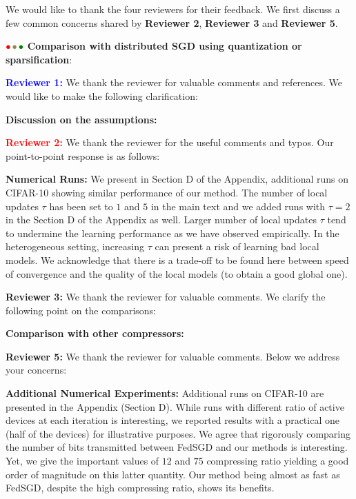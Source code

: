 \documentclass{article}
\begin{document}
We would like to thank the four reviewers for their feedback. 
We first discuss a few common concerns shared by \textbf{\color{red} Reviewer 2}, \textbf{\color{yellow!50!black}Reviewer 3} and \textbf{\color{green!50!black}Reviewer 5}.

${\color{red}\bullet}\!~{\color{yellow!50!black}\bullet}\!~{\color{green!50!black}\bullet}$ \textbf{Comparison with distributed SGD using quantization or sparsification}: 


\textbf{\textcolor{blue}{Reviewer 1:}} We thank the reviewer for valuable comments and references. We would like to make the following clarification:\vspace{-5pt}


\textbf{Discussion on the assumptions:} 

\textbf{\textcolor{red}{Reviewer 2:}} We thank the reviewer for the useful comments and typos. Our point-to-point response is as follows:\vspace{-5pt}

\textbf{Numerical Runs:} We present in Section D of the Appendix, additional runs on CIFAR-10 showing similar performance of our method. The number of local updates $\tau$ has been set to $1$ and $5$ in the main text and we added runs with $\tau = 2$ in the Section D of the Appendix as well. Larger number of local updates $\tau$ tend to undermine the learning performance as we have observed empirically. In the heterogeneous setting, increasing $\tau$ can present a risk of learning bad local models. We acknowledge that there is a trade-off to be found here between speed of convergence and the quality of the local models (to obtain a good global one).


\textbf{\textcolor{yellow!50!black}{Reviewer 3:}} We thank the reviewer for valuable comments. We clarify the following point on the comparisons:\vspace{-5pt}

\textbf{Comparison with other compressors:} 





\textbf{\textcolor{green!50!black}{Reviewer 5:}} We thank the reviewer for valuable comments. Below we address your concerns:\vspace{-5pt}

\textbf{Additional Numerical Experiments:} Additional runs on CIFAR-10 are presented in the Appendix (Section D). While runs with different ratio of active devices at each iteration is interesting, we reported results with a practical one (half of the devices) for illustrative purposes.
We agree that rigorously comparing the number of bits transmitted between FedSGD and our methods is interesting.
Yet, we give the important values of $12$ and $75$ compressing ratio yielding a good order of magnitude on this latter quantity. Our method being almost as fast as FedSGD, despite the high compressing ratio, shows its benefits.
\end{document}
